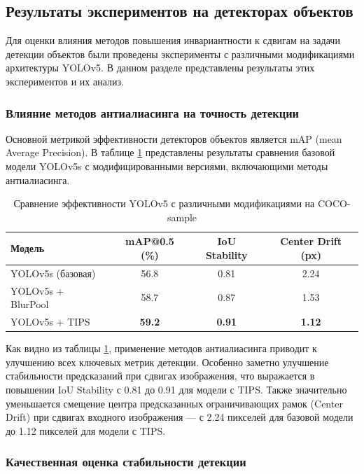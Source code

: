 \subsection{Результаты экспериментов на детекторах объектов}
\label{sec:results:detection}

Для оценки влияния методов повышения инвариантности к сдвигам на задачи детекции объектов были проведены эксперименты с различными модификациями архитектуры YOLOv5. В данном разделе представлены результаты этих экспериментов и их анализ.

\subsubsection{Влияние методов антиалиасинга на точность детекции}

Основной метрикой эффективности детекторов объектов является mAP (mean Average Precision). В таблице \ref{tab:detection_results} представлены результаты сравнения базовой модели YOLOv5s с модифицированными версиями, включающими методы антиалиасинга.

\begin{table}[h]
\centering
\caption{Сравнение эффективности YOLOv5 с различными модификациями на COCO-sample}
\label{tab:detection_results}
\begin{tabular}{lccc}
\toprule
\textbf{Модель} & \textbf{mAP@0.5 (\%)} & \textbf{IoU Stability} & \textbf{Center Drift (px)} \\
\midrule
YOLOv5s (базовая) & 56.8 & 0.81 & 2.24 \\
YOLOv5s + BlurPool & 58.7 & 0.87 & 1.53 \\
YOLOv5s + TIPS & \textbf{59.2} & \textbf{0.91} & \textbf{1.12} \\
\bottomrule
\end{tabular}
\end{table}

Как видно из таблицы \ref{tab:detection_results}, применение методов антиалиасинга приводит к улучшению всех ключевых метрик детекции. Особенно заметно улучшение стабильности предсказаний при сдвигах изображения, что выражается в повышении IoU Stability с 0.81 до 0.91 для модели с TIPS. Также значительно уменьшается смещение центра предсказанных ограничивающих рамок (Center Drift) при сдвигах входного изображения — с 2.24 пикселей для базовой модели до 1.12 пикселей для модели с TIPS.

\subsubsection{Качественная оценка стабильности детекции}

